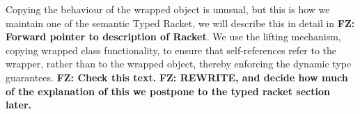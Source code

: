 \documentclass[acmlarge, anonymous, authordraft]{acmart}
\newcommand{\FZ}[1]{\textbf{FZ: #1}}
\begin{document}
Copying the behaviour of the wrapped object is unusual, but this is how we
maintain one of the semantic Typed Racket, we will describe this in detail in \FZ{Forward pointer to description of Racket}.
We use the lifting
mechanism, copying wrapped class functionality, to ensure that
self-references refer to the wrapper, rather than to the wrapped object,
thereby enforcing the dynamic type guarantees. \FZ{Check this text.}  \FZ{REWRITE, and decide how much of the explanation of this we postpone to the typed racket section later.}
%
%
%
%
%  
%
%
\end{document}
